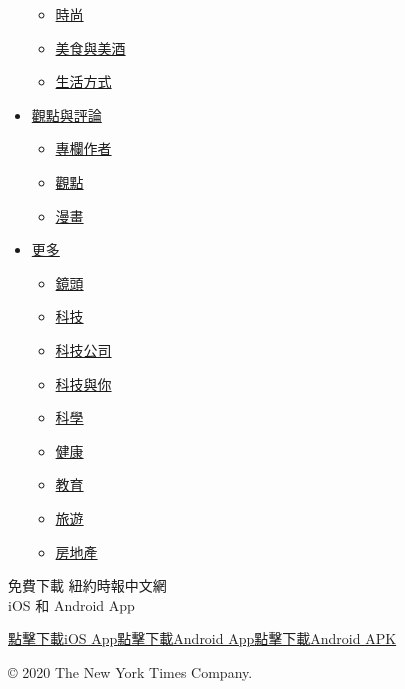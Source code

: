 \begin{itemize}
  \begin{itemize}
  \tightlist
  \item
    \href{/fashion/?utm_source=nav-footer}{時尚}
  \item
    \href{/food-wine/?utm_source=nav-footer}{美食與美酒}
  \item
    \href{/lifestyle/?utm_source=nav-footer}{生活方式}
  \end{itemize}
\item
  \href{/opinion/?utm_source=nav-footer}{觀點與評論}

  \begin{itemize}
  \tightlist
  \item
    \href{/op-column/?utm_source=nav-footer}{專欄作者}
  \item
    \href{/op-ed/?utm_source=nav-footer}{觀點}
  \item
    \href{/cartoon/?utm_source=nav-footer}{漫畫}
  \end{itemize}
\item
  \href{//?utm_source=nav-footer}{更多}

  \begin{itemize}
  \tightlist
  \item
    \href{/lens/?utm_source=nav-footer}{鏡頭}
  \item
    \href{/technology/?utm_source=nav-footer}{科技}
  \item
    \href{/bits/?utm_source=nav-footer}{科技公司}
  \item
    \href{/personal-tech/?utm_source=nav-footer}{科技與你}
  \item
    \href{/science/?utm_source=nav-footer}{科學}
  \item
    \href{/health/?utm_source=nav-footer}{健康}
  \item
    \href{/education/?utm_source=nav-footer}{教育}
  \item
    \href{/travel/?utm_source=nav-footer}{旅遊}
  \item
    \href{/real-estate/?utm_source=nav-footer}{房地產}
  \end{itemize}
\end{itemize}

免費下載 紐約時報中文網\\
iOS 和 Android App

\href{https://itunes.apple.com/app/apple-store/id807498298?pt=13036\&ct=mnews-article\&mt=8}{點擊下載iOS
App}\href{https://play.google.com/store/apps/details?id=com.nytimes.cn}{點擊下載Android
App}\href{https://nytcnapps.oss-cn-hongkong.aliyuncs.com/latest.apk}{點擊下載Android
APK}

© 2020 The New York Times Company.
